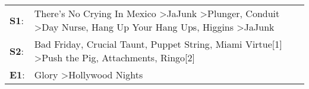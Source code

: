 \begin{supertabular}{p{0.03\textwidth}p{0.92\textwidth}}
 \textbf{S1}:  &  There's No Crying In Mexico\textsuperscript{} \textgreater \enspace JaJunk\textsuperscript{} \textgreater \enspace Plunger\textsuperscript{}, \enspace Conduit\textsuperscript{} \textgreater \enspace Day Nurse\textsuperscript{}, \enspace Hang Up Your Hang Ups\textsuperscript{}, \enspace Higgins\textsuperscript{} \textgreater \enspace JaJunk\textsuperscript{}  \enspace  \\
 \textbf{S2}:  &                                                                           Bad Friday\textsuperscript{}, \enspace Crucial Taunt\textsuperscript{}, \enspace Puppet String\textsuperscript{}, \enspace Miami Virtue[1]\textsuperscript{} \textgreater \enspace Push the Pig\textsuperscript{}, \enspace Attachments\textsuperscript{}, \enspace Ringo[2]\textsuperscript{}  \enspace  \\
 \textbf{E1}:  &                                                                                                                                                                                                                                                                                         Glory\textsuperscript{} \textgreater \enspace Hollywood Nights\textsuperscript{}  \enspace  \\
\end{supertabular}
